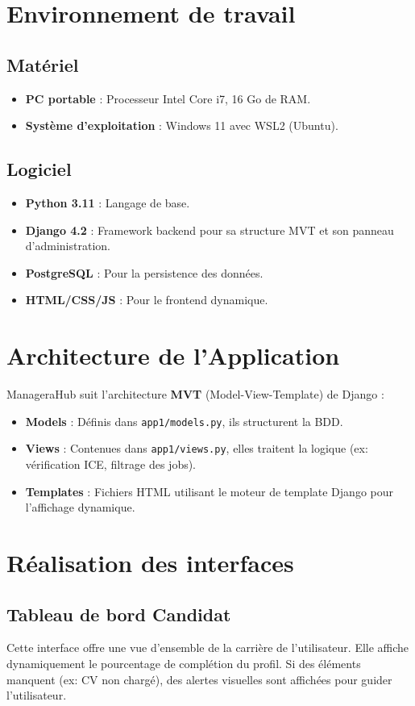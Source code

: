 \documentclass[12pt,a4paper]{report}
\begin{document}
\section{Environnement de travail}
\subsection{Matériel}
\begin{itemize}
    \item \textbf{PC portable} : Processeur Intel Core i7, 16 Go de RAM.
    \item \textbf{Système d'exploitation} : Windows 11 avec WSL2 (Ubuntu).
\end{itemize}
\subsection{Logiciel}
\begin{itemize}
    \item \textbf{Python 3.11} : Langage de base.
    \item \textbf{Django 4.2} : Framework backend pour sa structure MVT et son panneau d'administration.
    \item \textbf{PostgreSQL} : Pour la persistence des données.
    \item \textbf{HTML/CSS/JS} : Pour le frontend dynamique.
\end{itemize}

\section{Architecture de l'Application}
ManageraHub suit l'architecture \textbf{MVT} (Model-View-Template) de Django :
\begin{itemize}
    \item \textbf{Models} : Définis dans \texttt{app1/models.py}, ils structurent la BDD.
    \item \textbf{Views} : Contenues dans \texttt{app1/views.py}, elles traitent la logique (ex: vérification ICE, filtrage des jobs).
    \item \textbf{Templates} : Fichiers HTML utilisant le moteur de template Django pour l'affichage dynamique.
\end{itemize}

\section{Réalisation des interfaces}
\subsection{Tableau de bord Candidat}
Cette interface offre une vue d'ensemble de la carrière de l'utilisateur. Elle affiche dynamiquement le pourcentage de complétion du profil. Si des éléments manquent (ex: CV non chargé), des alertes visuelles sont affichées pour guider l'utilisateur.
\end{document}

